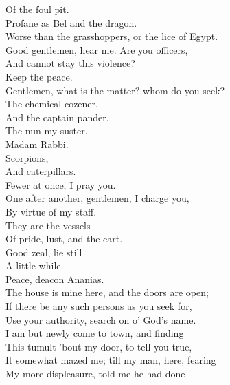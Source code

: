 \documentclass{memoir}
\begin{document}
\begin{drama*}
 Of the foul pit.\\
\tribulationspeaks {} Profane as Bel and the dragon.\\
\ananiasspeaks  Worse than the grasshoppers, or the lice of Egypt.\\
\lovewitspeaks  Good gentlemen, hear me. Are you officers,\\
 And cannot stay this violence?\\
\officeronespeaks {} Keep the peace.\\
\lovewitspeaks  Gentlemen, what is the matter? whom do you seek?\\
\mammonspeaks  The chemical cozener.\\
\surlyspeaks {} And the captain pander.\\
\kastrilspeaks  The nun my suster.\\
\mammonspeaks {} Madam Rabbi.\\
\ananiasspeaks {} Scorpions,\\
 And caterpillars.\\
\lovewitspeaks {} Fewer at once, I pray you.\\
\officertwospeaks  One after another, gentlemen, I charge you,\\
 By virtue of my staff.\\
\ananiasspeaks {} They are the vessels\\
 Of pride, lust, and the cart.\\
\lovewitspeaks {} Good zeal, lie still\\
 A little while.\\
\tribulationspeaks {} Peace, deacon Ananias.\\
\lovewitspeaks  The house is mine here, and the doors are open;\\
 If there be any such persons as you seek for,\\
 Use your authority, search on o' God's name.\\
 I am but newly come to town, and finding\\
 This tumult 'bout my door, to tell you true,\\
 It somewhat mazed me; till my man, here, fearing\\
 My more displeasure, told me he had done\\

\end{drama*}
\end{document}
